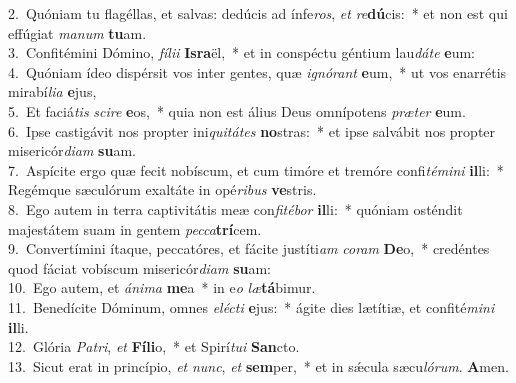 {2.~}Quóniam tu flagéllas, et salvas: dedúcis ad ínfe\textit{ros}, \textit{et} \textit{re}\textbf{dú}cis:~* et non est qui effúgiat \textit{ma}\textit{num} \textbf{tu}am.\\
{3.~}Confitémini Dómino, \textit{fí}\textit{li}\textit{i} \textbf{Is}\textbf{ra}ël,~* et in conspéctu géntium lau\textit{dá}\textit{te} \textbf{e}um:\\
{4.~}Quóniam ídeo dispérsit vos inter gentes, quæ \textit{i}\textit{gnó}\textit{rant} \textbf{e}um,~* ut vos enarrétis mirabí\textit{li}\textit{a} \textbf{e}jus,\\
{5.~}Et faciá\textit{tis} \textit{sci}\textit{re} \textbf{e}os,~* quia non est álius Deus omnípotens \textit{præ}\textit{ter} \textbf{e}um.\\
{6.~}Ipse castigávit nos propter ini\textit{qui}\textit{tá}\textit{tes} \textbf{no}stras:~* et ipse salvábit nos propter misericór\textit{di}\textit{am} \textbf{su}am.\\
{7.~}Aspícite ergo quæ fecit nobíscum, et cum timóre et tremóre confi\textit{té}\textit{mi}\textit{ni} \textbf{il}li:~* Regémque sæculórum exaltáte in opé\textit{ri}\textit{bus} \textbf{ve}stris.\\
{8.~}Ego autem in terra captivitátis meæ con\textit{fi}\textit{té}\textit{bor} \textbf{il}li:~* quóniam osténdit majestátem suam in gentem \textit{pec}\textit{ca}\textbf{trí}cem.\\
{9.~}Convertímini ítaque, peccatóres, et fácite justíti\textit{am} \textit{co}\textit{ram} \textbf{De}o,~* credéntes quod fáciat vobíscum misericór\textit{di}\textit{am} \textbf{su}am:\\
{10.~}Ego autem, et \textit{á}\textit{ni}\textit{ma} \textbf{me}a~* in e\textit{o} \textit{læ}\textbf{tá}bimur.\\
{11.~}Benedícite Dóminum, omnes \textit{e}\textit{lé}\textit{cti} \textbf{e}jus:~* ágite dies lætítiæ, et confité\textit{mi}\textit{ni} \textbf{il}li.\\
{12.~}Glória \textit{Pa}\textit{tri}, \textit{et} \textbf{Fí}\textbf{li}o,~* et Spirí\textit{tu}\textit{i} \textbf{San}cto.\\
{13.~}Sicut erat in princípio, \textit{et} \textit{nunc}, \textit{et} \textbf{sem}per,~* et in sǽcula sæcu\textit{ló}\textit{rum}. \textbf{A}men.\\
